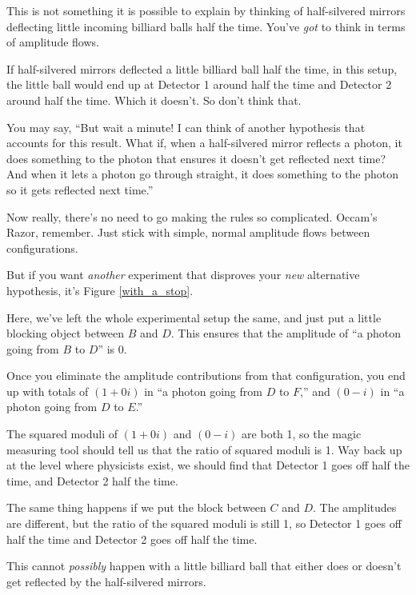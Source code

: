 {
 This is not something it is possible to explain by thinking of
half-silvered mirrors deflecting little incoming billiard balls half
the time. You've \textit{got} to think in terms of
amplitude flows.}

{
 If half-silvered mirrors deflected a little billiard ball half the
time, in this setup, the little ball would end up at Detector 1 around
half the time and Detector 2 around half the time. Which it
doesn't. So don't think that.}

{
 You may say, ``But wait a minute! I can think of
another hypothesis that accounts for this result. What if, when a
half-silvered mirror reflects a photon, it does something to the photon
that ensures it doesn't get reflected next time? And
when it lets a photon go through straight, it does something to the
photon so it gets reflected next time.''}

{
 Now really, there's no need to go making the rules
so complicated. Occam's Razor, remember. Just stick
with simple, normal amplitude flows between configurations.}

{
 But if you want \textit{another} experiment that disproves your
\textit{new} alternative hypothesis, it's Figure \ref{with_a_stop}.}


{
 Here, we've left the whole experimental setup the
same, and just put a little blocking object between $B$ and $D$. This
ensures that the amplitude of ``a photon going from $B$
to $D$'' is 0.}

{
 Once you eliminate the amplitude contributions from that
configuration, you end up with totals of $(1 + 0i)$ in
``a photon going from $D$ to $F$,'' and
$(0 -i)$ in ``a photon going from $D$ to
$E$.''}

{
 The squared moduli of $(1 + 0i)$ and $(0 - i)$ are both 1, so the
magic measuring tool should tell us that the ratio of squared moduli is
1. Way back up at the level where physicists exist, we should find that
Detector 1 goes off half the time, and Detector 2 half the time.}

{
 The same thing happens if we put the block between $C$ and $D$. The
amplitudes are different, but the ratio of the squared moduli is still
1, so Detector 1 goes off half the time and Detector 2 goes off half
the time.}

{
 This cannot \textit{possibly} happen with a little billiard ball
that either does or doesn't get reflected by the
half-silvered mirrors.}


